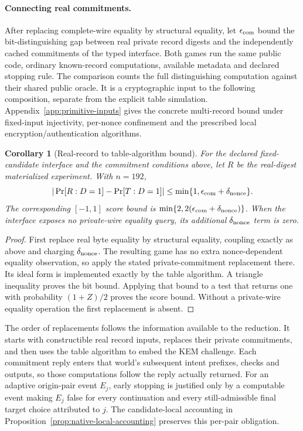 \documentclass[pdflatex]{sn-jnl}
\theoremstyle{thmstyleone}
\newtheorem{corollary}[theorem]{Corollary}
\theoremstyle{thmstylethree}
\theoremstyle{thmstyletwo}
\begin{document}
\paragraph{Connecting real commitments.}
After replacing complete-wire equality by structural equality, let
$\epsilon_{\rm com}$ bound the bit-distinguishing gap between real private
record digests and the independently cached commitments of the typed
interface. Both games run the same public code, ordinary known-record
computations, available metadata and declared stopping rule. The comparison
counts the full distinguishing computation against their shared public oracle.
It is a cryptographic input to the following composition, separate from the
explicit table simulation. Appendix~\ref{app:primitive-inputs} gives the
concrete multi-record bound under fixed-input injectivity, per-nonce
confinement and the prescribed local encryption/authentication algorithms.

\begin{corollary}[Real-record to table-algorithm bound]
\label{cor:real-to-opaque}
For the declared fixed-candidate interface and the commitment conditions
above, let $R$ be the real-digest materialized experiment. With $n=192$,
\[
 |\Pr[R:D=1]-\Pr[T:D=1]|
 \leq\min\{1,\epsilon_{\rm com}+\delta_{\rm nonce}\}.
\]
The corresponding $[-1,1]$ score bound is
$\min\{2,2(\epsilon_{\rm com}+\delta_{\rm nonce})\}$.
When the interface exposes no private-wire equality query, its additional
$\delta_{\rm nonce}$ term is zero.
\end{corollary}
\begin{proof}
First replace real byte equality by structural equality, coupling exactly
as above and charging $\delta_{\rm nonce}$. The resulting game has no extra
nonce-dependent equality observation, so apply the stated private-commitment
replacement there. Its ideal form is implemented exactly by the table
algorithm. A triangle inequality proves the bit bound. Applying that bound
to a test that returns one with probability $(1+Z)/2$ proves the score bound.
Without a private-wire equality operation the first replacement is absent.
\end{proof}

The order of replacements follows the information available to the
reduction. It starts with constructible real record inputs, replaces their
private commitments, and then uses the table algorithm to embed the KEM
challenge. Each commitment reply enters that world's subsequent intent
prefixes, checks and outputs, so those computations follow the reply
actually returned. For an adaptive origin-pair
event $E_j$, early stopping is justified only by a computable event making
$E_j$ false for every continuation and every still-admissible final target
choice attributed to $j$. The candidate-local accounting in
Proposition~\ref{prop:native-local-accounting} preserves this per-pair
obligation.
\end{document}
